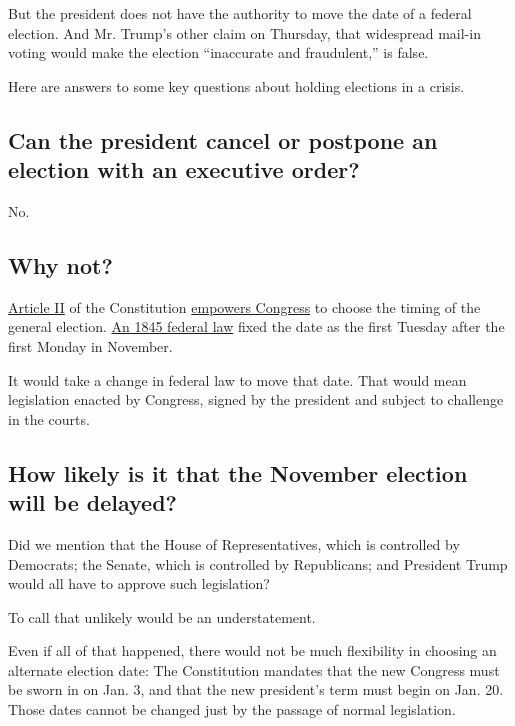 But the president does not have the authority to move the date of a
federal election. And Mr. Trump's other claim on Thursday, that
widespread mail-in voting would make the election ``inaccurate and
fraudulent,'' is false.

Here are answers to some key questions about holding elections in a
crisis.

\hypertarget{can-the-president-cancel-or-postpone-an-election-with-an-executive-order}{%
\subsection{Can the president cancel or postpone an election with an
executive
order?}\label{can-the-president-cancel-or-postpone-an-election-with-an-executive-order}}

No.

\hypertarget{why-not}{%
\subsection{Why not?}\label{why-not}}

\href{https://constitution.congress.gov/browse/essay/artII-S1-C4-1/ALDE_00000230/}{Article
II} of the Constitution
\href{https://crsreports.congress.gov/product/pdf/R/R46413}{empowers
Congress} to choose the timing of the general election.
\href{https://www.loc.gov/law/help/statutes-at-large/28th-congress/session-2/c28s2ch1.pdf}{An
1845 federal law} fixed the date as the first Tuesday after the first
Monday in November.

It would take a change in federal law to move that date. That would mean
legislation enacted by Congress, signed by the president and subject to
challenge in the courts.

\hypertarget{how-likely-is-it-that-the-november-election-will-be-delayed}{%
\subsection{How likely is it that the November election will be
delayed?}\label{how-likely-is-it-that-the-november-election-will-be-delayed}}

Did we mention that the House of Representatives, which is controlled by
Democrats; the Senate, which is controlled by Republicans; and President
Trump would all have to approve such legislation?

To call that unlikely would be an understatement.

Even if all of that happened, there would not be much flexibility in
choosing an alternate election date: The Constitution mandates that the
new Congress must be sworn in on Jan. 3, and that the new president's
term must begin on Jan. 20. Those dates cannot be changed just by the
passage of normal legislation.

